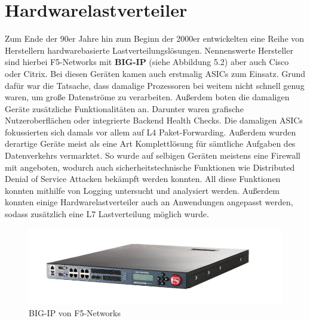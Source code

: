 \section{Hardwarelastverteiler}
Zum Ende der 90er Jahre hin zum Beginn der 2000er entwickelten eine Reihe von Herstellern hardwarebasierte Lastverteilungslösungen. Nennenswerte Hersteller sind hierbei F5-Networks mit \textbf{BIG-IP} (siehe Abbildung 5.2) aber auch Cisco oder Citrix. Bei diesen Geräten kamen auch erstmalig ASICs zum Einsatz. Grund dafür war die Tatsache, dass damalige Prozessoren bei weitem nicht schnell genug waren, um große Datenströme zu verarbeiten. Außerdem boten die damaligen Geräte zusätzliche Funktionalitäten an. Darunter waren grafische Nutzeroberflächen oder integrierte Backend Health Checks. \cite{bigip} Die damaligen ASICs fokussierten sich damals vor allem auf L4 Paket-Forwarding. Außerdem wurden derartige Geräte meist als eine Art Komplettlösung für sämtliche Aufgaben des Datenverkehrs vermarktet. So wurde auf selbigen Geräten meistens eine Firewall mit angeboten, wodurch auch sicherheitstechnische Funktionen wie Distributed Denial of Service Attacken bekämpft werden konnten. All diese Funktionen konnten mithilfe von Logging untersucht und analysiert werden. Außerdem konnten einige Hardwarelastverteiler auch an Anwendungen angepasst werden, sodass zusätzlich eine L7 Lastverteilung möglich wurde.
\begin{figure}
    \centering
    \includegraphics[width=1\linewidth]{images/s-l1600.jpg}
    \caption{BIG-IP von F5-Networks}
    \label{fig:enter-label}
\end{figure}
